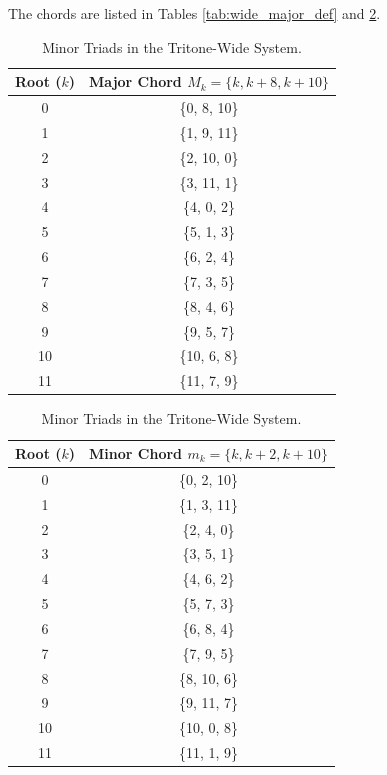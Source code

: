 \documentclass[12pt,letterpaper]{amsart}
\begin{document}
The chords are listed in Tables \ref{tab:wide_major_def} and \ref{tab:wide_minor_def}.

\begin{table}[H]
\centering
\scriptsize
\renewcommand{\arraystretch}{1.2}
\begin{minipage}{0.48\textwidth}
\centering
\begin{tabular}{|c|c|}
\hline
\textbf{Root} ($k$) & \textbf{Major Chord} $M_k = \{k, k+8, k+10\}$ \\
\hline
0 & \{0, 8, 10\} \\
1 & \{1, 9, 11\} \\
2 & \{2, 10, 0\} \\
3 & \{3, 11, 1\} \\
4 & \{4, 0, 2\} \\
5 & \{5, 1, 3\} \\
6 & \{6, 2, 4\} \\
7 & \{7, 3, 5\} \\
8 & \{8, 4, 6\} \\
9 & \{9, 5, 7\} \\
10 & \{10, 6, 8\} \\
11 & \{11, 7, 9\} \\
\hline
\end{tabular}
\caption{Major Triads in the Tritone-Wide System.}
\label{tab:wide_major_def}
\end{minipage}
\hfill
\begin{minipage}{0.48\textwidth}
\centering
\begin{tabular}{|c|c|}
\hline
\textbf{Root} ($k$) & \textbf{Minor Chord} $m_k = \{k, k+2, k+10\}$ \\
\hline
0 & \{0, 2, 10\} \\
1 & \{1, 3, 11\} \\
2 & \{2, 4, 0\} \\
3 & \{3, 5, 1\} \\
4 & \{4, 6, 2\} \\
5 & \{5, 7, 3\} \\
6 & \{6, 8, 4\} \\
7 & \{7, 9, 5\} \\
8 & \{8, 10, 6\} \\
9 & \{9, 11, 7\} \\
10 & \{10, 0, 8\} \\
11 & \{11, 1, 9\} \\
\hline
\end{tabular}
\caption{Minor Triads in the Tritone-Wide System.}
\label{tab:wide_minor_def}
\end{minipage}
\end{table}
\end{document}
